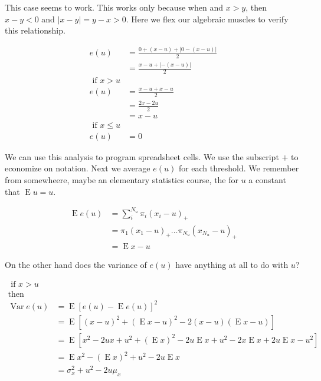 \documentclass[
]{book}
\begin{document}
This case seems to work. This works only because when and \(x > y\), then \(x-y < 0\) and \(|x-y| = y-x > 0\). Here we flex our algebraic muscles to verify this relationship.

\[
\begin{align}
e(u) &= \frac{0 + (x-u) + |0 - (x - u)|}{2} \\
     &= \frac{x-u + |- (x - u)|}{2} \\
     \text{ if } x>u \\
e(u) &= \frac{x-u + x - u}{2} \\
     &= \frac{2x - 2u}{2} \\
     &= x -u\\
     \text{ if } x \leq u \\
e(u) &= 0     
\end{align}
\]

We can use this analysis to program spreadsheet cells. We use the subscript \(+\) to economize on notation. Next we average \(e(u)\) for each threshold. We remember from somewheere, maybe an elementary statistics course, the for \(u\) a constant that \(\operatorname{E}u = u\).

\[
\begin{align}
\operatorname{E}e(u) &= \sum_i^{N_u} \pi_i (x_i - u)_+ \\
                     &= \pi_1 (x_1 - u )_+ \ldots \pi_{N_u} (x_{N_u} - u )_+ \\
                     &= \operatorname{E}x - u
\end{align}
\]

On the other hand does the variance of \(e(u)\) have anything at all to do with \(u\)?

\[
\begin{align}
\text{ if } x > u \\
\text{then} \\
\operatorname{Var}e(u) &= \operatorname{E}[e(u) - \operatorname{E}e(u)]^2 \\
     &= \operatorname{E}[(x-u)^2 + (\operatorname{E}x - u)^2 - 2(x-u)(\operatorname{E}x - u)] \\
     &= \operatorname{E}[x^2 - 2ux + u^2 + (\operatorname{E}x)^2 - 2u\operatorname{E}x +u^2 - 2x\operatorname{E}x + 2u\operatorname{E}x - u^2] \\
     &= \operatorname{E}x^2 - (\operatorname{E}x)^2 + u^2 - 2u\operatorname{E}x \\
     &= \sigma_x^2 + u^2 - 2u \mu_x
\end{align}
\]
\end{document}
